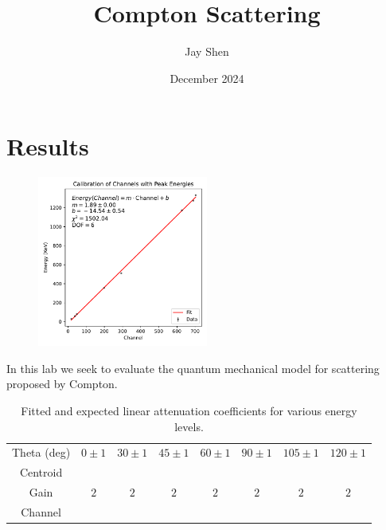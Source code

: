 \documentclass[12pt, letterpaper]{article}
\title{Compton Scattering}
\author{Jay Shen}
\date{December 2024}
\begin{document}
\maketitle

\section{Results}

\begin{figure}[!h]
    \centering
    \includegraphics[width=0.5\textwidth]{experiment2/figures/calibration.pdf}
    \caption{}
    \label{fig:cs137-spectrum}
\end{figure}

In this lab we seek to evaluate the quantum mechanical model for scattering proposed by Compton. 

\begin{table}[h]
\centering
\begin{tabular}{|c | c c c c c c c |}
    \hline
    Theta (deg) & $0 \pm 1$ & $30 \pm 1$ & $45 \pm 1$ & $60 \pm 1$ & $90 \pm 1$ & $105 \pm 1$ & $120 \pm 1$ \\
    Centroid & \\
    Gain & $2$ & $2$ & $2$ & $2$ & $2$ & $2$ & $2$ \\
    \hline
    Channel \\
    \hline
\end{tabular}
\caption{Fitted and expected linear attenuation coefficients for various energy levels.}
\label{table:1}
\end{table}
\end{document}
